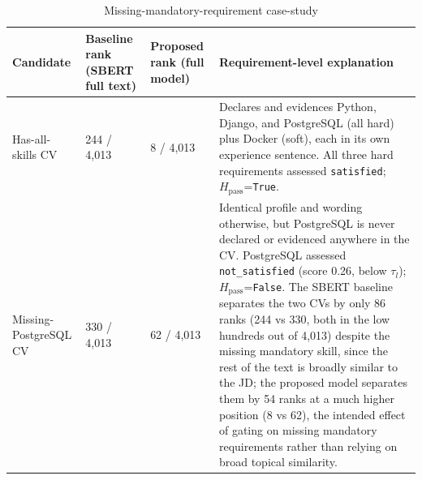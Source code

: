\documentclass[12pt,a4paper,oneside]{report}
\begin{document}
\begin{table}[htbp]
\centering
\caption{Missing-mandatory-requirement case-study}
\label{tab:missing-mandatory-case}
\begin{tabularx}{\textwidth}{p{}p{}p{}X}
\toprule
Candidate & Baseline rank (SBERT full text) & Proposed rank (full model) & Requirement-level explanation \\
\midrule
Has-all-skills CV & 244 / 4,013 & 8 / 4,013 & Declares and evidences Python, Django, and PostgreSQL (all hard) plus Docker (soft), each in its own experience sentence. All three hard requirements assessed \texttt{satisfied}; $H_{\mathrm{pass}}$=\texttt{True}. \\
Missing-PostgreSQL CV & 330 / 4,013 & 62 / 4,013 & Identical profile and wording otherwise, but PostgreSQL is never declared or evidenced anywhere in the CV. PostgreSQL assessed \texttt{not\_satisfied} (score 0.26, below $\tau_l$); $H_{\mathrm{pass}}$=\texttt{False}. The SBERT baseline separates the two CVs by only 86 ranks (244 vs 330, both in the low hundreds out of 4,013) despite the missing mandatory skill, since the rest of the text is broadly similar to the JD; the proposed model separates them by 54 ranks at a much higher position (8 vs 62), the intended effect of gating on missing mandatory requirements rather than relying on broad topical similarity. \\
\bottomrule
\end{tabularx}
\end{table}
\end{document}
